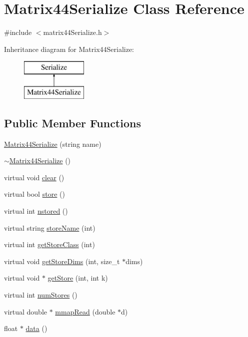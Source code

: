 \hypertarget{classMatrix44Serialize}{\section{Matrix44\-Serialize Class Reference}
\label{classMatrix44Serialize}
}


{\ttfamily \#include $<$matrix44\-Serialize.\-h$>$}

Inheritance diagram for Matrix44\-Serialize\-:\begin{figure}[H]
\begin{center}
\leavevmode
\includegraphics[height=2.000000cm]{classMatrix44Serialize}
\end{center}
\end{figure}
\subsection*{Public Member Functions}
\begin{DoxyCompactItemize}
\item 
\hyperlink{classMatrix44Serialize_a0bcff20c12377cecee29099007ab5fc7}{Matrix44\-Serialize} (string name)
\item 
\hyperlink{classMatrix44Serialize_a9d0a79d7f215cbcc763e777cf0379fb8}{$\sim$\-Matrix44\-Serialize} ()
\item 
virtual void \hyperlink{classMatrix44Serialize_aaea63fa835d82cc7d039323e678ec58a}{clear} ()
\item 
virtual bool \hyperlink{classMatrix44Serialize_a96da5f524e0e2522085f82b20f6e3de0}{store} ()
\item 
virtual int \hyperlink{classMatrix44Serialize_ab1531b0cb71530688376e3b5f9e05076}{nstored} ()
\item 
virtual string \hyperlink{classMatrix44Serialize_a1262b03de3cf08dab616bdb44b354d3d}{store\-Name} (int)
\item 
virtual int \hyperlink{classMatrix44Serialize_a543c479bc5f47c7045988f14dc398cfa}{get\-Store\-Class} (int)
\item 
virtual void \hyperlink{classMatrix44Serialize_ad2a049be2ae27daad403c7e1d7ca4de0}{get\-Store\-Dims} (int, size\-\_\-t $\ast$dims)
\item 
virtual void $\ast$ \hyperlink{classMatrix44Serialize_a4690b73080db8812c3ca0970f05c699d}{get\-Store} (int, int k)
\item 
virtual int \hyperlink{classMatrix44Serialize_aa87157b168588ba1e29d6dee6529e906}{num\-Stores} ()
\item 
virtual double $\ast$ \hyperlink{classMatrix44Serialize_a9882ee2bdc032d63cc2daf6eb25a7464}{mmap\-Read} (double $\ast$d)
\item 
float $\ast$ \hyperlink{classMatrix44Serialize_aec8417e383b9da42858da90c26144f8b}{data} ()
\end{DoxyCompactItemize}
